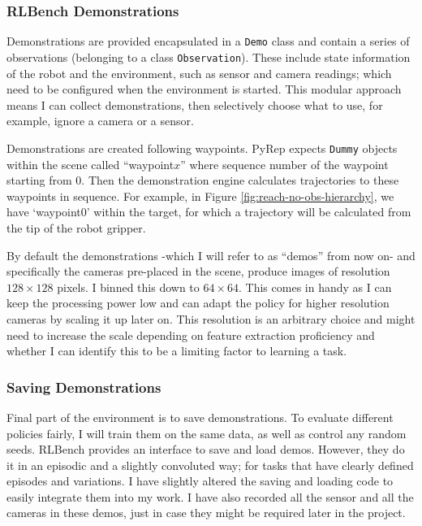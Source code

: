 \subsubsection{RLBench Demonstrations}
Demonstrations are provided encapsulated in a \verb|Demo| class and contain a series of observations (belonging to a class \verb|Observation|). These include state information of the robot and the environment, such as sensor and camera readings; which need to be configured when the environment is started. This modular approach means I can collect demonstrations, then selectively choose what to use, for example, ignore a camera or a sensor. \par 
Demonstrations are created following waypoints. PyRep expects  \verb|Dummy| objects within the scene called ``waypoint$x$'' where sequence number of the waypoint starting from $0$. Then the demonstration engine calculates trajectories to these waypoints in sequence. For example, in Figure \ref{fig:reach-no-obs-hierarchy}, we have `waypoint0' within the target, for which a trajectory will be calculated from the tip of the robot gripper.

By default the demonstrations -which I will refer to as ``demos'' from now on- and specifically the cameras pre-placed in the scene, produce images of resolution $128 \times 128$ pixels. I binned this down to $64 \times 64$. This comes in handy as I can keep the processing power low and can adapt the policy for higher resolution cameras by scaling it up later on. This resolution is an arbitrary choice and might need to increase the scale depending on feature extraction proficiency and whether I can identify this to be a limiting factor to learning a task.

\subsubsection{Saving Demonstrations}\label{subsec:saving-demos}
Final part of the environment is to save demonstrations. To evaluate different policies fairly, I will train them on the same data, as well as control any random seeds. RLBench provides an interface to save and load demos. However, they do it in an episodic and a slightly convoluted way; for tasks that have clearly defined episodes and variations. I have slightly altered the saving and loading code to easily integrate them into my work. I have also recorded all the sensor and all the cameras in these demos, just in case they might be required later in the project.

